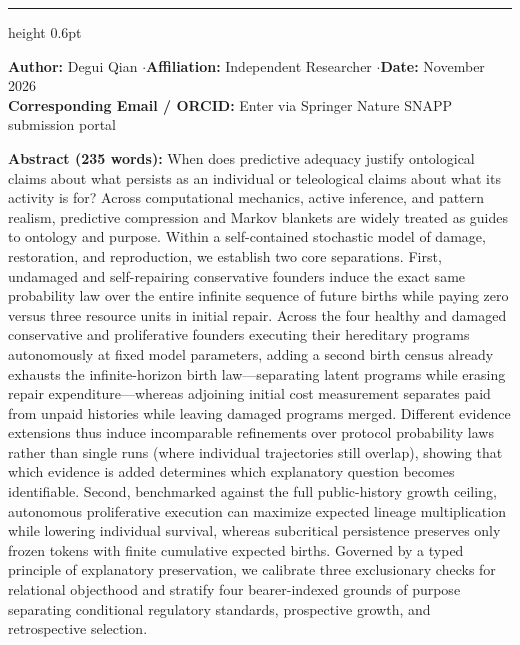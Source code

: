 \documentclass[10pt,a4paper]{article}
\begin{document}
\pagestyle{empty}
\vspace{6pt}
\hrule height 0.6pt
\vspace{10pt}

\vspace{9pt}

\noindent\textbf{Author:} Degui Qian \quad$\cdot$\quad \textbf{Affiliation:} Independent Researcher \quad$\cdot$\quad \textbf{Date:} November 2026\\
\textbf{Corresponding Email / ORCID:} Enter via Springer Nature SNAPP submission portal

\vspace{8pt}
\noindent\textbf{Abstract (235 words):} When does predictive adequacy justify ontological claims about what persists as an individual or teleological claims about what its activity is for? Across computational mechanics, active inference, and pattern realism, predictive compression and Markov blankets are widely treated as guides to ontology and purpose. Within a self-contained stochastic model of damage, restoration, and reproduction, we establish two core separations. First, undamaged and self-repairing conservative founders induce the exact same probability law over the entire infinite sequence of future births while paying zero versus three resource units in initial repair. Across the four healthy and damaged conservative and proliferative founders executing their hereditary programs autonomously at fixed model parameters, adding a second birth census already exhausts the infinite-horizon birth law---separating latent programs while erasing repair expenditure---whereas adjoining initial cost measurement separates paid from unpaid histories while leaving damaged programs merged. Different evidence extensions thus induce incomparable refinements over protocol probability laws rather than single runs (where individual trajectories still overlap), showing that which evidence is added determines which explanatory question becomes identifiable. Second, benchmarked against the full public-history growth ceiling, autonomous proliferative execution can maximize expected lineage multiplication while lowering individual survival, whereas subcritical persistence preserves only frozen tokens with finite cumulative expected births. Governed by a typed principle of explanatory preservation, we calibrate three exclusionary checks for relational objecthood and stratify four bearer-indexed grounds of purpose separating conditional regulatory standards, prospective growth, and retrospective selection.
\end{document}

